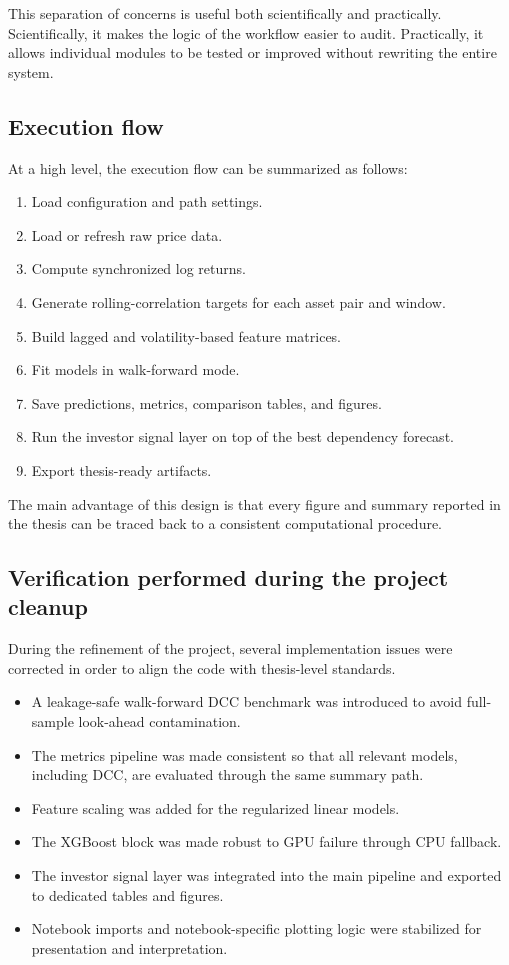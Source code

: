 This separation of concerns is useful both scientifically and practically. Scientifically, it makes the logic of the workflow easier to audit. Practically, it allows individual modules to be tested or improved without rewriting the entire system.

\subsection{Execution flow}

At a high level, the execution flow can be summarized as follows:

\begin{enumerate}
    \item Load configuration and path settings.
    \item Load or refresh raw price data.
    \item Compute synchronized log returns.
    \item Generate rolling-correlation targets for each asset pair and window.
    \item Build lagged and volatility-based feature matrices.
    \item Fit models in walk-forward mode.
    \item Save predictions, metrics, comparison tables, and figures.
    \item Run the investor signal layer on top of the best dependency forecast.
    \item Export thesis-ready artifacts.
\end{enumerate}

The main advantage of this design is that every figure and summary reported in the thesis can be traced back to a consistent computational procedure.

\subsection{Verification performed during the project cleanup}

During the refinement of the project, several implementation issues were corrected in order to align the code with thesis-level standards.

\begin{itemize}
    \item A leakage-safe walk-forward DCC benchmark was introduced to avoid full-sample look-ahead contamination.
    \item The metrics pipeline was made consistent so that all relevant models, including DCC, are evaluated through the same summary path.
    \item Feature scaling was added for the regularized linear models.
    \item The XGBoost block was made robust to GPU failure through CPU fallback.
    \item The investor signal layer was integrated into the main pipeline and exported to dedicated tables and figures.
    \item Notebook imports and notebook-specific plotting logic were stabilized for presentation and interpretation.
\end{itemize}

